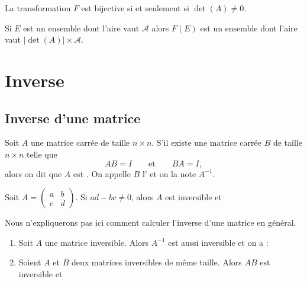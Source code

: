 \documentclass[11pt,class=report,crop=false]{standalone}
\begin{document}
\begin{proposition}
	La transformation $F$ est bijective si et seulement si $\det(A) \neq 0$.
\end{proposition}

\begin{proposition}
	Si $E$ est un ensemble dont l'aire vaut $\mathcal{A}$ alors $F(E)$ est un ensemble dont l'aire vaut $|\det(A)| \times \mathcal{A}$.
\end{proposition}



\section{Inverse}

\subsection{Inverse d'une matrice}


Soit $A$ une matrice  carrée de taille $n \times n$. S'il existe une matrice carrée
$B$ de taille $n \times n$ telle que
$$ AB = I\qquad \text{et} \qquad BA = I, $$
alors on dit que $A$ est . On appelle $B$ l'
et on la note $A^{-1}$.



\begin{proposition}
Soit $A = \begin{pmatrix}
	a & b\\
	c & d
\end{pmatrix}$.	
Si $ad - bc \not= 0$,  alors $A$ est inversible et
\end{proposition}


Nous n'expliquerons pas ici comment calculer l'inverse d'une matrice en général.

\begin{proposition}
\sauteligne
\begin{enumerate}
	\item 	
	Soit $A$ une matrice inversible. Alors
	$A^{-1}$ est aussi inversible et on a :
	
	\item 
	Soient $A$ et $B$ deux matrices inversibles de même taille. Alors
	$AB$ est inversible et
\end{enumerate}
\end{proposition}
\end{document}
